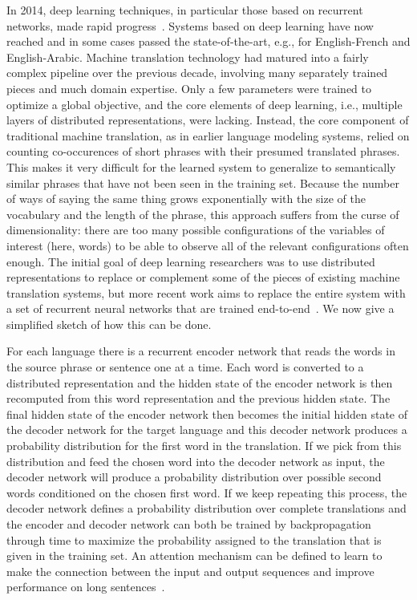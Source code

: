 \documentclass[11pt]{article} %
\begin{document}
In 2014, deep learning techniques, in particular those based on recurrent
networks, made rapid
progress~\citep{Devlin-et-al-ACL2014,Bahdanau-et-al-arxiv2014,Sutskever-et-al-arxiv2014}. Systems
based on deep learning have now reached and in some cases passed the
state-of-the-art, e.g., for English-French and English-Arabic. Machine
translation technology had matured into a fairly complex pipeline over the
previous decade, involving many separately trained pieces and much
domain expertise. Only a few parameters were trained to optimize a global
objective, and the core elements of deep learning, i.e., multiple layers of
distributed representations, were lacking. Instead, the core component of
traditional machine translation, as in earlier language modeling systems,
relied on counting co-occurences of short phrases with their presumed
translated phrases. This makes it very difficult for the learned system to
generalize to semantically similar phrases that have not been seen in the
training set. Because the number of ways of saying the same thing grows
exponentially with the size of the vocabulary and the length of the phrase,
this approach suffers from the curse of dimensionality: there are too many
possible configurations of the variables of interest (here, words) to be
able to observe all of the relevant configurations often enough. The
initial goal of deep learning researchers was to use distributed
representations to replace or complement some of the pieces of existing
machine translation systems, but more recent work aims to replace the
entire system with a set of recurrent neural networks that are trained
end-to-end~\citep{Bahdanau-et-al-arxiv2014,Sutskever-et-al-arxiv2014}.
We now give a simplified sketch of how this can be done.

For each language there is a recurrent encoder network that reads the words
in the source phrase or sentence one at a time. Each word is converted to a
distributed representation and the hidden state of the encoder network is
then recomputed from this word representation and the previous hidden
state. The final hidden state of the encoder network then becomes the
initial hidden state of the decoder network for the target language and
this decoder network produces a probability distribution for the first word
in the translation. If we pick from this distribution and feed the chosen
word into the decoder network as input, the decoder network will produce a
probability distribution over possible second words conditioned on the
chosen first word. If we keep repeating this process, the decoder network
defines a probability distribution over complete translations and the
encoder and decoder network can both be trained by backpropagation through
time to maximize the probability assigned to the translation that is given
in the training set. An attention mechanism can be defined to
learn to make the connection between the input and output sequences
and improve performance on long sentences~\citep{Bahdanau-et-al-arxiv2014}.
\end{document}
